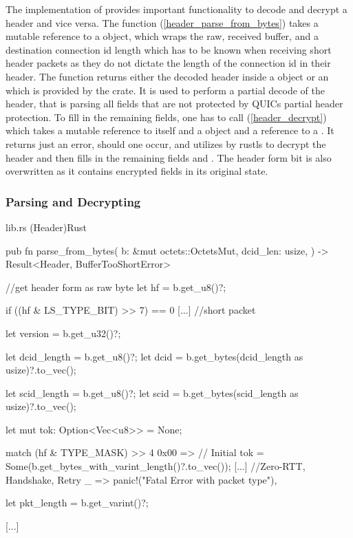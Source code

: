 The implementation of  provides important functionality to decode and decrypt a header and vice versa. The function
(\ref{header_parse_from_bytes}) takes a mutable reference to a  object, which wraps the raw,
received buffer, and
a destination connection id length which has to be known when receiving short header packets as they do not dictate the length of the connection
id in their header. The function returns either the decoded header inside a  object or an  which
is provided by the  crate. It is used to perform a partial decode of the header, that is parsing all fields that are not protected
by QUICs partial
header protection. To fill in the remaining fields, one has to call (\ref{header_decrypt}) which takes a mutable reference to
itself and a  object and a reference to a . It returns just an error, should one occur, and utilizes
 by rustls to decrypt the header and then fills in the remaining fields  and
. The header form bit is also overwritten as it contains encrypted fields in its original state.

\subsubsection{Parsing and Decrypting}

\begin{codeblock}{lib.rs (Header)}{Rust}
    \begin{rustcode}
        pub fn parse_from_bytes(
            b: &mut octets::OctetsMut,
            dcid_len: usize,
        ) -> Result<Header, BufferTooShortError> {
            //get header form as raw byte
            let hf = b.get_u8()?;

            if ((hf & LS_TYPE_BIT) >> 7) == 0 {
                [...] //short packet
            }

            let version = b.get_u32()?;

            let dcid_length = b.get_u8()?;
            let dcid = b.get_bytes(dcid_length as usize)?.to_vec();

            let scid_length = b.get_u8()?;
            let scid = b.get_bytes(scid_length as usize)?.to_vec();

            let mut tok: Option<Vec<u8>> = None;

            match (hf & TYPE_MASK) >> 4 {
                0x00 => {
                    // Initial
                    tok = Some(b.get_bytes_with_varint_length()?.to_vec());
                }
                [...] //Zero-RTT, Handshake, Retry
                _ => panic!("Fatal Error with packet type"),
            }

            let pkt_length = b.get_varint()?;

            [...]
        }
    \end{rustcode}
    \label{header_parse_from_bytes}
\end{codeblock}

